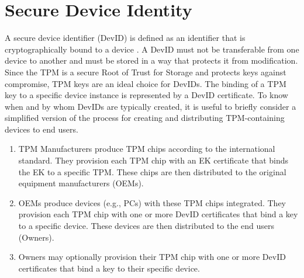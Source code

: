 \chapter{Secure Device Identity}


A secure device identifier (DevID) is defined as an identifier that is cryptographically bound to a device \cite{DevIDSpec-IEEE}. A DevID must not be transferable from one device to another and must be stored in a way that protects it from modification. Since the TPM is a secure Root of Trust for Storage and protects keys against compromise, TPM keys are an ideal choice for DevIDs. 
The binding of a TPM key to a specific device instance is represented by a DevID certificate.
To know when and by whom DevIDs are typically created, it is useful to briefly consider a simplified version of the process for creating and distributing TPM-containing devices to end users.
\begin{enumerate}
  \item\label{ite:idTPM} TPM Manufacturers produce TPM chips according to the international standard. They provision each TPM chip with an EK certificate that binds the EK to a specific TPM. These chips are then distributed to the original equipment manufacturers (OEMs).
  \item\label{ite:idDevIni} OEMs produce devices (e.g., PCs) with these TPM chips integrated. They provision each TPM chip with one or more DevID certificates that bind a key to a specific device. These devices are then distributed to the end users (Owners).
  \item\label{ite:idDevLoc} Owners may optionally provision their TPM chip with one or more DevID certificates that bind a key to their specific device.
\end{enumerate} 

